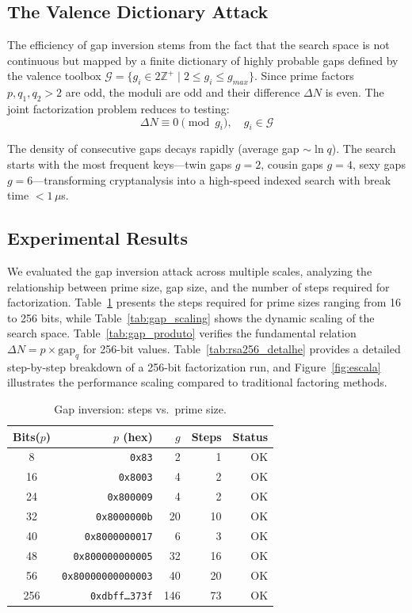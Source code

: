 \documentclass{sbc2023-pdf}%
\theoremstyle{plain}
\begin{document}
\subsection{The Valence Dictionary Attack}

The efficiency of gap inversion stems from the fact that the search space is not continuous but mapped by a finite dictionary of highly probable gaps defined by the valence toolbox \(\mathcal{G} = \{g_i \in 2\mathbb{Z}^+ \mid 2 \le g_i \le g_{max}\}\). Since prime factors \(p,q_1,q_2>2\) are odd, the moduli are odd and their difference \(\Delta N\) is even. The joint factorization problem reduces to testing:
\[
\Delta N \equiv 0 \pmod{g_i}, \quad g_i \in \mathcal{G}
\]

The density of consecutive gaps decays rapidly (average gap \(\sim \ln q\)). The search starts with the most frequent keys---twin gaps \(g=2\), cousin gaps \(g=4\), sexy gaps \(g=6\)---transforming cryptanalysis into a high-speed indexed search with break time \(<1\,\mu\)s.

\subsection{Experimental Results}

We evaluated the gap inversion attack across multiple scales, analyzing the relationship between prime size, gap size, and the number of steps required for factorization. Table~\ref{tab:gap_inversion} presents the steps required for prime sizes ranging from 16 to 256 bits, while Table~\ref{tab:gap_scaling} shows the dynamic scaling of the search space. Table~\ref{tab:gap_produto} verifies the fundamental relation \(\Delta N = p \times \text{gap}_q\) for 256-bit values. Table~\ref{tab:rsa256_detalhe} provides a detailed step-by-step breakdown of a 256-bit factorization run, and Figure~\ref{fig:escala} illustrates the performance scaling compared to traditional factoring methods.

\begin{table}[htbp]
\centering
\caption{Gap inversion: steps vs.\ prime size.}
\label{tab:gap_inversion}
\begin{tabular}{crrrr}
\toprule
Bits(\(p\)) & \(p\) (hex) & \(g\) & Steps & Status \\
\midrule
8  & \texttt{0x83} & 2  & 1   & OK \\
16 & \texttt{0x8003} & 4  & 2   & OK \\
24 & \texttt{0x800009} & 4  & 2   & OK \\
32 & \texttt{0x8000000b} & 20 & 10  & OK \\
40 & \texttt{0x8000000017} & 6  & 3   & OK \\
48 & \texttt{0x800000000005} & 32 & 16  & OK \\
56 & \texttt{0x80000000000003} & 40 & 20  & OK \\
256 & \texttt{0xdbff\ldots 373f} & 146 & 73 & OK \\
\bottomrule
\end{tabular}
\end{table}
\end{document}
